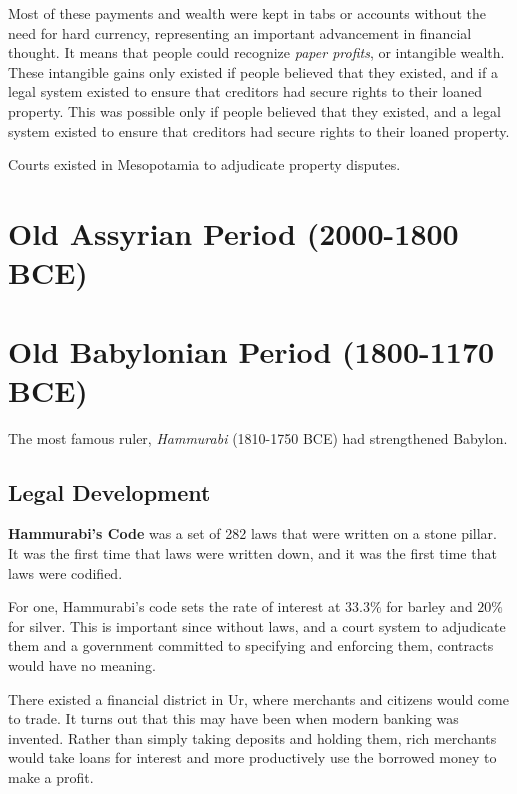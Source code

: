\documentclass{article}
\begin{document}
    Most of these payments and wealth were kept in tabs or accounts without the need for hard currency, representing an important advancement in financial thought. It means that people could recognize \textit{paper profits}, or intangible wealth. These intangible gains only existed if people believed that they existed, and if a legal system existed to ensure that creditors had secure rights to their loaned property. This was possible only if people believed that they existed, and a legal system existed to ensure that creditors had secure rights to their loaned property. 

    \begin{legal}
      Courts existed in Mesopotamia to adjudicate property disputes. 
    \end{legal}

\section{Old Assyrian Period (2000-1800 BCE)}


\section{Old Babylonian Period (1800-1170 BCE)}

  The most famous ruler, \textit{Hammurabi} (1810-1750 BCE) had strengthened Babylon. 

  \subsection{Legal Development}

    \begin{legal}
      \textbf{Hammurabi's Code} was a set of 282 laws that were written on a stone pillar. It was the first time that laws were written down, and it was the first time that laws were codified.
    \end{legal}

    For one, Hammurabi's code sets the rate of interest at $33.3\%$ for barley and $20\%$ for silver. This is important since without laws, and a court system to adjudicate them and a government committed to specifying and enforcing them, contracts would have no meaning. 

    There existed a financial district in Ur, where merchants and citizens would come to trade. It turns out that this may have been when modern banking was invented. Rather than simply taking deposits and holding them, rich merchants would take loans for interest and more productively use the borrowed money to make a profit. 
\end{document}
